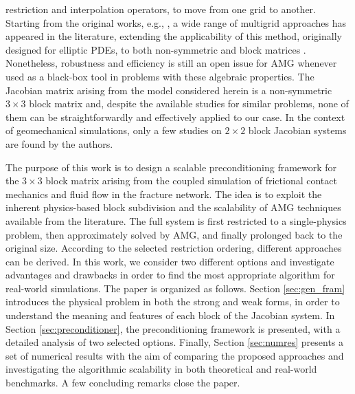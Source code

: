 \documentclass[3p,times]{elsarticle}
\theoremstyle{plain}
\begin{document}
restriction and interpolation operators, to move from one grid to another. Starting from the original
works, e.g., \cite{ruge1987algebraic}, a wide range of multigrid approaches has appeared in the literature,
extending the applicability of this method, originally designed for elliptic PDEs, to both
non-symmetric \cite{manteuffel2018nonsymmetric, manteuffel2019nonsymmetric} and block matrices \cite{webster2016stabilisation, brenner2014multigrid, chen2015multigrid,
brenner2018multigrid, wiesner2021algebraic, brenner2020multigrid}. 
Nonetheless, robustness and efficiency is still an open issue for AMG whenever used %
as a black-box tool in problems with these algebraic properties.
The Jacobian matrix arising from the model considered herein is a
non-symmetric $3 \times 3$ block matrix and, despite the available studies for
similar problems, none of them can be straightforwardly and effectively
applied to our case. In the context of geomechanical simulations, only a few studies
on $2 \times 2$ block Jacobian systems \cite{aagaard2013domain, franceschini2019block,
wiesner2021algebraic} are found by the authors.

The purpose of this work is to design a scalable preconditioning framework for the $3 \times 3$
block matrix arising from the coupled simulation of frictional contact mechanics and fluid flow in the fracture network. The idea is to exploit the inherent physics-based block subdivision and the scalability of AMG techniques available from the literature. 
The full system is first restricted to a single-physics problem, then approximately solved by AMG, and finally prolonged back to the original size.
According to the selected restriction ordering, different approaches can be derived. In this work, we consider two different options and investigate advantages and drawbacks in order to
find the most appropriate algorithm for real-world simulations. %
%
The paper is organized as follows. Section \ref{sec:gen_fram} introduces the
physical problem in both the strong and weak forms, in order to understand the meaning and
features of each block of the Jacobian system. In Section \ref{sec:preconditioner},
the preconditioning framework is presented, with a detailed analysis of two selected options. Finally, Section \ref{sec:numres} presents a set of numerical results with the aim of
comparing the proposed approaches %
and investigating the algorithmic scalability %
in both theoretical and real-world benchmarks.
A few concluding remarks close the paper.
\end{document}
